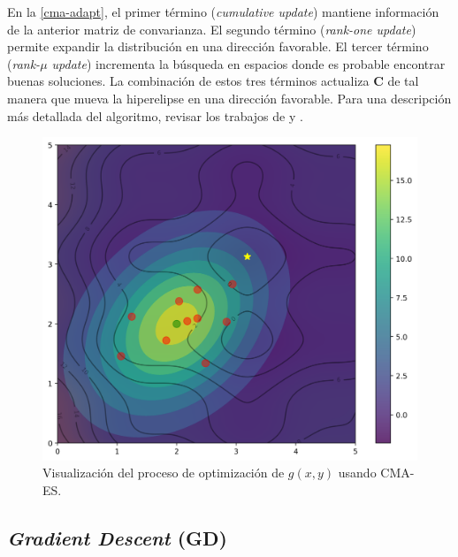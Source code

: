 En la \autoref{cma-adapt}, el primer término (\emph{cumulative update}) 
mantiene información de la anterior matriz de convarianza.
El segundo término (\emph{rank-one update}) permite expandir la distribución en
una dirección favorable.
El tercer término (\emph{rank-$\mu$ update}) incrementa la búsqueda en espacios
donde es probable encontrar buenas soluciones.
La combinación de estos tres términos actualiza $\boldsymbol{C}$ de tal manera que
mueva la hiperelipse en una dirección favorable. 
Para una descripción más detallada del algoritmo, revisar los trabajos de \cite{Hansen2016} y \cite{Mykel2019}.

\begin{figure}[ht]
  \centering
  \includegraphics[scale=0.5]{image/theory/CMA.png}
   \caption{Visualización del proceso de optimización de $g(x, y)$ usando CMA-ES.}
  \label{fig:cma}
\end{figure}



\subsection{\emph{Gradient Descent} (GD)}\label{sec:gradient-descent}

